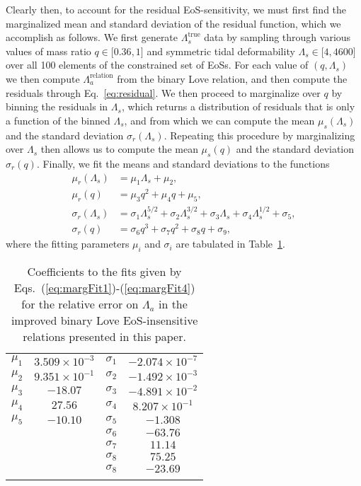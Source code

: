 \documentclass[prd,twocolumn,nofootinbib,superscriptaddress,amsmath,amssymb]{revtex4-1}
\begin{document}
Clearly then, to account for the residual EoS-sensitivity, we must first find the marginalized mean and standard deviation of the residual function, which we accomplish as follows. We first generate $\Lambda_{s}^{\textrm{true}}$ data by sampling through various values of mass ratio $q\in \lbrack0.36,1\rbrack$ and symmetric tidal deformability $\Lambda_{s} \in \lbrack 4,4600 \rbrack$ over all 100 elements of the constrained set of EoSs. For each value of $(q,\Lambda_{s})$ we then compute $\Lambda_{a}^{\textrm{relation}}$ from the binary Love relation, and then compute the residuals through Eq.~\eqref{eq:residual}. We then proceed to marginalize over $q$ by binning the residuals in $\Lambda_{s}$, which returns a distribution of residuals that is only a function of the binned $\Lambda_{s}$, and from which we can compute the mean $\mu_{s}(\Lambda_{s})$ and the standard deviation $\sigma_{r}(\Lambda_{s})$. Repeating this procedure by marginalizing over $\Lambda_{s}$ then allows us to compute the mean $\mu_{s}(q)$ and the standard deviation $\sigma_{r}(q)$. Finally, we fit the means and standard deviations to the functions~\cite{Katerina:residuals}
\begin{align}
\mu_{r}(\Lambda_s) &= \mu_1 \Lambda_s + \mu_2, \label{eq:margFit1}\\ 
\mu_{r}(q) &= \mu_3 q^2 + \mu_4 q + \mu_5, \label{eq:margFit2}\\ 
\sigma_{r}(\Lambda_s) &= \sigma_1 \Lambda_s^{5/2} + \sigma_2 \Lambda_s^{3/2} + \sigma_3 \Lambda_s +  \sigma_4 \Lambda_s^{1/2} + \sigma_5, \label{eq:margFit3}\\ 
\sigma_{r}(q) &= \sigma_6 q^3 + \sigma_7 q^2 + \sigma_8 q + \sigma_9, 
\label{eq:margFit4}
\end{align}
where the fitting parameters $\mu_i$ and $\sigma_i$ are tabulated in Table~\ref{tab:marginalized}. 

\begin{table}
\centering
\addtolength{\tabcolsep}{1pt} 
\begin{tabular}{ c | c || c | c}
\hline 
\noalign{\smallskip}
$\mu_1$ & $3.509 \times 10^{-3}$ & $\sigma_1$ & $-2.074 \times 10^{-7}$\\
$\mu_2$ & $9.351 \times 10^{-1}$ & $\sigma_2$ & $-1.492 \times 10^{-3}$\\
$\mu_3$ & $-18.07$ & $\sigma_3$ & $-4.891 \times 10^{-2}$\\
$\mu_4$ & $27.56$ & $\sigma_4$ & $8.207 \times 10^{-1}$\\
$\mu_5$ & $-10.10$ & $\sigma_5$ & $-1.308$\\
 &  & $\sigma_6$ & $-63.76$\\
 &  & $\sigma_7$ & $11.14$\\
 &  & $\sigma_8$ & $75.25$\\
 &  & $\sigma_8$ & $-23.69$\\
 \noalign{\smallskip}
 \hline
\end{tabular}
\caption{
Coefficients to the fits given by Eqs.~(\ref{eq:margFit1})-(\ref{eq:margFit4}) for the relative error on $\Lambda_a$ in the improved binary Love EoS-insensitive relations presented in this paper.
}\label{tab:marginalized}
\addtolength{\tabcolsep}{-1pt}
\end{table}
\end{document}
